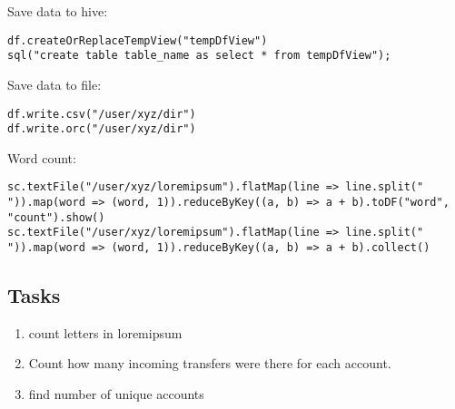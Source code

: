 \documentclass{article}
\begin{document}
Save data to hive:
\begin{lstlisting}[]
df.createOrReplaceTempView("tempDfView")
sql("create table table_name as select * from tempDfView");
\end{lstlisting}

Save data to file:
\begin{lstlisting}[]
df.write.csv("/user/xyz/dir")
df.write.orc("/user/xyz/dir")
\end{lstlisting}

Word count:
\begin{lstlisting}[]
sc.textFile("/user/xyz/loremipsum").flatMap(line => line.split(" ")).map(word => (word, 1)).reduceByKey((a, b) => a + b).toDF("word", "count").show()
sc.textFile("/user/xyz/loremipsum").flatMap(line => line.split(" ")).map(word => (word, 1)).reduceByKey((a, b) => a + b).collect()
\end{lstlisting}


\subsection*{Tasks}

\begin{enumerate}
\item count letters in loremipsum
\item Count how many incoming transfers were there for each account.
\item find number of unique accounts
\end{enumerate}
\end{document}
